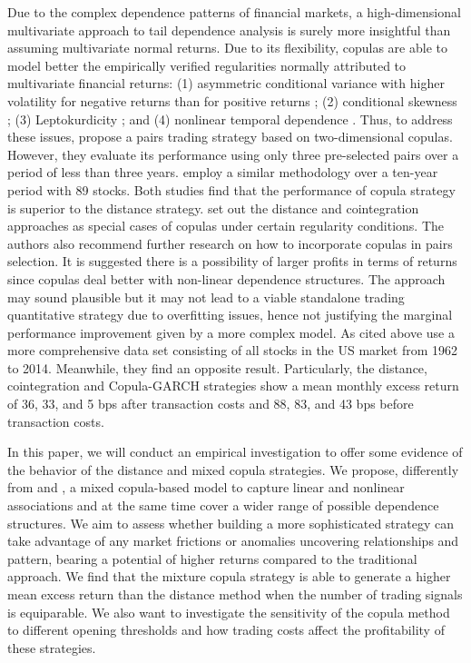 Due to the complex dependence patterns of financial markets, a high-dimensional multivariate approach to tail dependence analysis is surely more insightful than assuming multivariate normal returns. Due to its flexibility, copulas are able to model better the empirically verified regularities normally attributed to multivariate financial returns: (1) asymmetric conditional variance with higher volatility for negative returns than for positive returns \citep{h98}; (2) conditional skewness \citep{ait01,chen01,patton01}; (3) Leptokurdicity \citep{t01,andreou01}; and (4) nonlinear temporal dependence \citep{cont01,campbell97}. Thus, to address these issues, \citet*{lw2013} propose a pairs trading strategy based on two-dimensional copulas. However, they evaluate its performance using only three pre-selected pairs over a period of less than three years. \citet*{xie14} employ a similar methodology over a ten-year period with 89 stocks. Both studies find that the performance of copula strategy is superior to the distance strategy. \citet*{xw13} set out the distance and cointegration approaches as special cases of copulas under certain regularity conditions. The authors also recommend further research on how to incorporate copulas in pairs selection. It is suggested there is a possibility of larger profits in terms of returns since copulas deal better with non-linear dependence structures. The approach may sound plausible but it may not lead to a viable standalone trading quantitative strategy due to overfitting issues, hence not justifying the marginal performance improvement given by a more complex model. As cited above \citet*{rf15} use a more comprehensive data set consisting of all stocks in the US market from 1962 to 2014. Meanwhile, they find an opposite result. Particularly, the distance, cointegration and Copula-GARCH strategies show a mean monthly excess return of 36, 33, and 5 bps after transaction costs and 88, 83, and 43 bps before transaction costs.

In this paper, we will conduct an empirical investigation to offer some evidence of the behavior of the distance and mixed copula strategies. We propose, differently from \citet*{rf15} and \citet*{xie14}, a mixed copula-based model to capture linear and nonlinear associations and at the same time cover a wider range of possible dependence structures. We aim to assess whether building a more sophisticated strategy can take advantage of any market frictions or anomalies uncovering relationships and pattern, bearing a potential of higher returns compared to the traditional approach. We find that the mixture copula strategy is able to generate a higher mean excess return than the distance method when the number of trading signals is equiparable. We also want to investigate the sensitivity of the copula method to different opening thresholds and how trading costs affect the profitability of these strategies.


